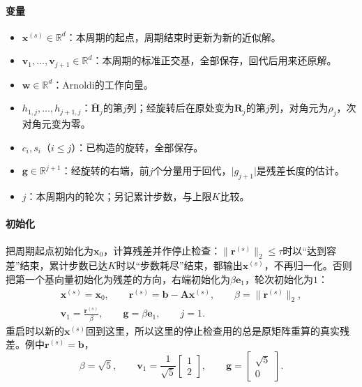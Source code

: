 \paragraph{变量}
\begin{itemize}
 \item $\bm x^{(s)}\in\mathbb R^d$：本周期的起点，周期结束时更新为新的近似解。
 \item $\bm v_1,\ldots,\bm v_{j+1}\in\mathbb R^d$：本周期的标准正交基，全部保存，回代后用来还原解。
 \item $\bm w\in\mathbb R^d$：Arnoldi的工作向量。
 \item $h_{1,j},\ldots,h_{j+1,j}$：$\overline{\bm H}_j$的第$j$列；经旋转后在原处变为$\bm R_j$的第$j$列，对角元为$\rho_j$，次对角元变为零。
 \item $c_i,s_i$（$i\le j$）：已构造的旋转，全部保存。
 \item $\bm g\in\mathbb R^{j+1}$：经旋转的右端，前$j$个分量用于回代，$\lvert g_{j+1}\rvert$是残差长度的估计。
 \item $j$：本周期内的轮次；另记累计步数，与上限$K$比较。
\end{itemize}

\paragraph{初始化}
把周期起点初始化为$\bm x_0$，计算残差并作停止检查：$\lVert\bm r^{(s)}\rVert_2\le\tau$时以“达到容差”结束，累计步数已达$K$时以“步数耗尽”结束，都输出$\bm x^{(s)}$，不再归一化。否则把第一个基向量初始化为残差的方向，右端初始化为$\beta\bm e_1$，轮次初始化为$1$：
\[
 \begin{gathered}
 \bm x^{(s)}=\bm x_0,\qquad \bm r^{(s)}=\bm b-\bm A\bm x^{(s)},\qquad \beta=\lVert\bm r^{(s)}\rVert_2,\\
 \bm v_1=\frac{\bm r^{(s)}}{\beta},\qquad \bm g=\beta\bm e_1,\qquad j=1 .
 \end{gathered}
\]
重启时以新的$\bm x^{(s)}$回到这里，所以这里的停止检查用的总是原矩阵重算的真实残差。例中$\bm r^{(s)}=\bm b$，
\[
 \beta=\sqrt5,\qquad \bm v_1=\frac1{\sqrt5}\begin{bmatrix}1\\2\end{bmatrix},\qquad \bm g=\begin{bmatrix}\sqrt5\\0\end{bmatrix}.
\]

